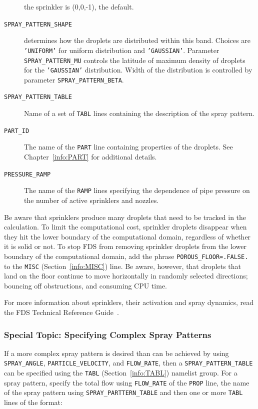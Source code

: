 \documentclass[11pt]{book}
\newcommand{\ct}{\tt\small}
\begin{document}
\begin{description}
the sprinkler is (0,0,-1), the default.
\item[{\ct SPRAY\_PATTERN\_SHAPE}] determines how the droplets are distributed within this band.
Choices are {\ct 'UNIFORM'} for uniform distribution and {\ct 'GAUSSIAN'}. Parameter {\ct SPRAY\_PATTERN\_MU} controls the latitude of
maximum density of droplets for the {\ct 'GAUSSIAN'} distribution. Width of the distribution is controlled by parameter {\ct SPRAY\_PATTERN\_BETA}.
\item[{\ct SPRAY\_PATTERN\_TABLE}] Name of a set of {\ct TABL} lines containing the description of the spray pattern.
\item[{\ct PART\_ID}] The name of the {\ct PART} line containing properties of the droplets.
See Chapter~\ref{info:PART} for additional details.
\item[{\ct PRESSURE\_RAMP}] The name of the {\ct RAMP} lines specifying the dependence of pipe pressure on the
number of active sprinklers and nozzles.
\end{description}

\noindent
Be aware that sprinklers produce many droplets that need to be
tracked in the calculation. To limit the computational cost, sprinkler droplets disappear when they hit the
lower boundary of the computational domain, regardless of whether it is solid
or not. To stop FDS from removing sprinkler droplets from the lower boundary of the computational domain,
add the phrase {\ct POROUS\_FLOOR=.FALSE.} to the {\ct MISC} (Section~\ref{info:MISC}) line. Be aware, however, that
droplets that land on the floor continue to move horizontally in randomly selected
directions; bouncing off obstructions, and consuming CPU time.

For more information about sprinklers, their activation and spray dynamics, read the FDS
Technical Reference Guide~\cite{FDS_Math_Guide}.


\subsubsection{Special Topic: Specifying Complex Spray Patterns}
\label{info:spraypattern}

If a more complex spray pattern is desired than can be achieved by using {\ct SPRAY\_ANGLE}, {\ct PARTICLE\_VELOCITY},
and {\ct FLOW\_RATE}, then a {\ct SPRAY\_PATTERN\_TABLE} can be specified using the {\ct TABL} (Section~\ref{info:TABL})
namelist group.  For a spray pattern, specify the total flow using {\ct FLOW\_RATE} of the {\ct PROP} line, the name of the spray pattern using
{\ct SPRAY\_PARTTERN\_TABLE} and then one or more {\ct TABL} lines of the format:
\end{document}
